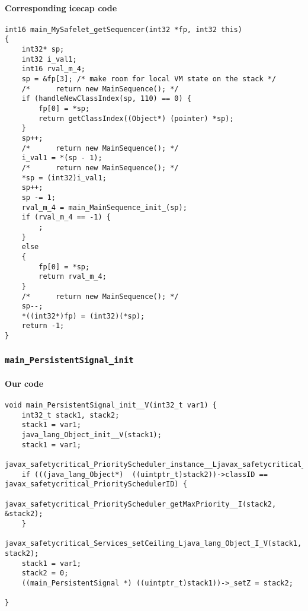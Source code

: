 \paragraph{Corresponding icecap code}\hfill
\begin{lstlisting}[firstnumber=54422]
int16 main_MySafelet_getSequencer(int32 *fp, int32 this)
{
	int32* sp;
	int32 i_val1;
	int16 rval_m_4;
	sp = &fp[3]; /* make room for local VM state on the stack */
	/*		return new MainSequence(); */
	if (handleNewClassIndex(sp, 110) == 0) {
		fp[0] = *sp;
		return getClassIndex((Object*) (pointer) *sp);
	}
	sp++;
	/*		return new MainSequence(); */
	i_val1 = *(sp - 1);
	/*		return new MainSequence(); */
	*sp = (int32)i_val1;
	sp++;
	sp -= 1;
	rval_m_4 = main_MainSequence_init_(sp);
	if (rval_m_4 == -1) {
		;
	}
	else
	{
		fp[0] = *sp;
		return rval_m_4;
	}
	/*		return new MainSequence(); */
	sp--;
	*((int32*)fp) = (int32)(*sp);
	return -1;
}
\end{lstlisting}

\subsubsection{\texttt{main\_PersistentSignal\_init}}

\paragraph{Our code}\hfill
\begin{lstlisting}[firstnumber=257]
void main_PersistentSignal_init__V(int32_t var1) {
	int32_t stack1, stack2;
	stack1 = var1;
	java_lang_Object_init__V(stack1);
	stack1 = var1;
	javax_safetycritical_PriorityScheduler_instance__Ljavax_safetycritical_PriorityScheduler_(&stack2);
	if (((java_lang_Object*)  ((uintptr_t)stack2))->classID == javax_safetycritical_PrioritySchedulerID) {
		javax_safetycritical_PriorityScheduler_getMaxPriority__I(stack2, &stack2);
	}
	javax_safetycritical_Services_setCeiling_Ljava_lang_Object_I_V(stack1, stack2);
	stack1 = var1;
	stack2 = 0;
	((main_PersistentSignal *) ((uintptr_t)stack1))->_setZ = stack2;

}
\end{lstlisting}


